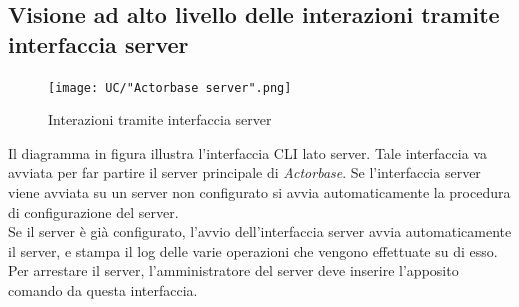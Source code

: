 \documentclass[a4paper]{article}
\begin{document}
		 \subsection{Visione ad alto livello delle interazioni tramite interfaccia server}
		 	\begin{figure}[H]
				\centering
				\texttt{[image: UC/"Actorbase server".png]}
				\caption{Interazioni tramite interfaccia server}
			\end{figure}
			Il diagramma in figura illustra l'interfaccia CLI lato server. Tale interfaccia va avviata per far partire il server principale di \emph{Actorbase}. Se l'interfaccia server viene avviata su un server non configurato si avvia automaticamente la procedura di configurazione del server. 
			\\ 
			Se il server è già configurato, l'avvio dell'interfaccia server avvia automaticamente il server, e stampa il log delle varie operazioni che vengono effettuate su di esso.
			\\ 
			Per arrestare il server, l'amministratore del server deve inserire l'apposito comando da questa interfaccia.
		 
		 
		 
		 
		 
		 
	 
\end{document}
